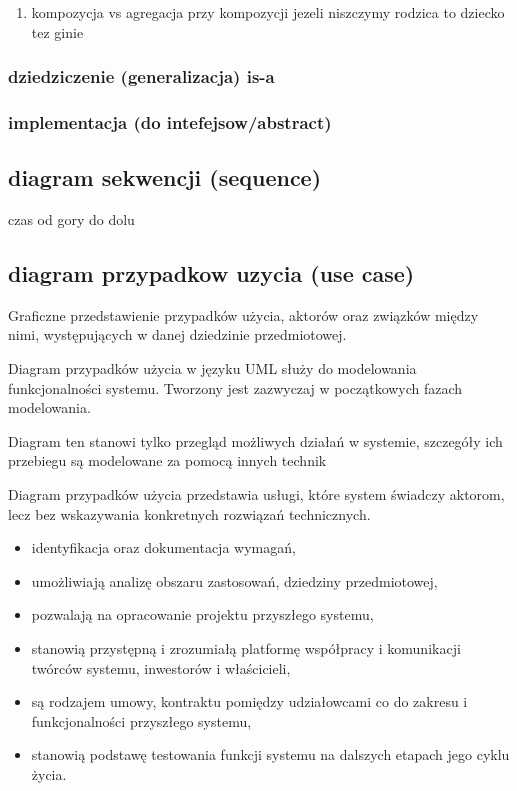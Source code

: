 \documentclass[11pt]{article}
\begin{document}
\begin{enumerate}
\item kompozycja vs agregacja
\label{sec:org87328f8}
przy kompozycji jezeli niszczymy rodzica to dziecko tez ginie
\end{enumerate}
\subsubsection{dziedziczenie (generalizacja) is-a}
\label{sec:org83d04fc}
\subsubsection{implementacja (do intefejsow/abstract)}
\label{sec:orgb8d31d1}
\subsection{diagram sekwencji (sequence)}
\label{sec:org969cbeb}
czas od gory do dolu 
\subsection{diagram przypadkow uzycia (use case)}
\label{sec:org409ef42}
Graficzne przedstawienie przypadków użycia, aktorów oraz związków między nimi, występujących w danej dziedzinie przedmiotowej.

Diagram przypadków użycia w języku UML służy do modelowania funkcjonalności systemu. Tworzony jest zazwyczaj w początkowych fazach modelowania.

Diagram ten stanowi tylko przegląd możliwych działań w systemie, szczegóły ich przebiegu są modelowane za pomocą innych technik

Diagram przypadków użycia przedstawia usługi, które system świadczy aktorom, lecz bez wskazywania konkretnych rozwiązań technicznych.


\begin{itemize}
\item identyfikacja oraz dokumentacja wymagań,
\item umożliwiają analizę obszaru zastosowań, dziedziny przedmiotowej,
\item pozwalają na opracowanie projektu przyszłego systemu,
\item stanowią przystępną i zrozumiałą platformę współpracy i komunikacji twórców systemu, inwestorów i właścicieli,
\item są rodzajem umowy, kontraktu pomiędzy udziałowcami co do zakresu i funkcjonalności przyszłego systemu,
\item stanowią podstawę testowania funkcji systemu na dalszych etapach jego cyklu życia.
\end{itemize}
\end{document}
